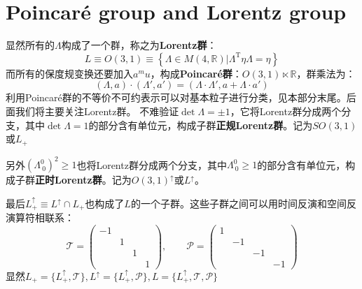 \section{Poincar\'e group and Lorentz group}
显然所有的$\Lambda$构成了一个群，称之为\textbf{Lorentz群}：
\begin{equation}
	L\equiv O(3,1)\equiv\left\{\Lambda\in M(4,\mathbb{R})|	\Lambda^{\operatorname{T}}\eta\Lambda=\eta\right\}
\end{equation}
而所有的保度规变换还要加入$a^mu$，构成\textbf{Poincar\'e群}：$O(3,1)\ltimes \mathbb{R}$，群乘法为：
\begin{equation}
	(\Lambda,a)\cdot(\Lambda',a')=(\Lambda\cdot\Lambda',a+\Lambda\cdot a')
\end{equation}
利用Poincar\'e群的不等价不可约表示可以对基本粒子进行分类，见本部分末尾。后面我们将主要关注Lorentz群。
不难验证$\det \Lambda=\pm 1$，它将Lorentz群分成两个分支，其中$\det \Lambda=1$的部分含有单位元，构成子群\textbf{正规Lorentz群}。记为$SO(3,1)$或$L_+$

另外$(\Lambda^0_{\ 0})^2\geq 1$也将Lorentz群分成两个分支，其中$\Lambda^0_{\ 0}\geq1$的部分含有单位元，构成子群\textbf{正时Lorentz群}。记为$O(3,1)^\uparrow$或$L^\uparrow$。

最后$L^\uparrow_+\equiv L^\uparrow\cap L_+$也构成了$L$的一个子群。这些子群之间可以用时间反演和空间反演算符相联系：
\begin{equation}
	\mathcal{T}=\begin{pmatrix}
		-1&  &  & \\
		& 1 &  & \\
		&  & 1 & \\
		&  &  &1
	\end{pmatrix},\quad\quad\mathcal{P}=\begin{pmatrix}
	1&  &  & \\
	& -1 &  & \\
	&  & -1 & \\
	&  &  &-1
	\end{pmatrix}
\end{equation}
显然$L_+=\{L_+^\uparrow,\mathcal{T}\},L^\uparrow=\{L_+^\uparrow,\mathcal{P}\},L=\{L_+^\uparrow,\mathcal{T},\mathcal{P}\}$

